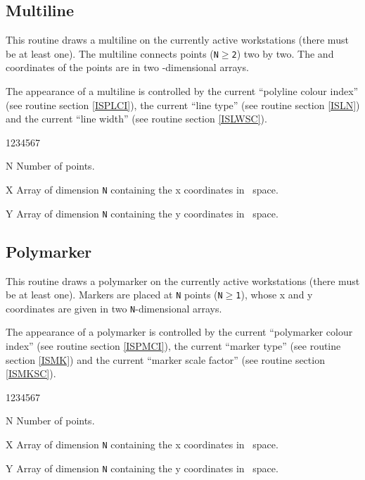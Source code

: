 \subsection{Multiline}
\Action
This routine draws a multiline on the currently active workstations (there must
be at least one). The multiline connects  points ({\tt N$\geq$2}) two
by two. The  and  coordinates of the points are in two 
-dimensional arrays.

The appearance of a multiline is controlled by the current ``polyline colour
index'' (see routine  section \ref{ISPLCI}), the current
``line type'' (see routine  section \ref{ISLN}) and the current
``line width'' (see routine  section \ref{ISLWSC}).
\Pdesc
\begin{DLtt}{1234567}
\item[N] Number of points.
\item[X] Array of dimension {\tt N} containing the x coordinates in \wc~space.
\item[Y] Array of dimension {\tt N} containing the y coordinates in \wc~space.
\end{DLtt}


\subsection{Polymarker}
\Action
This routine draws a polymarker on the currently active workstations (there must
be at least one). Markers are placed at {\tt N} points ({\tt N$\geq$1}), whose x
and y coordinates are given in two {\tt N}-dimensional arrays.

The appearance of a polymarker is controlled by the current ``polymarker colour
index'' (see routine  section \ref{ISPMCI}), the current ``marker
type'' (see routine  section \ref{ISMK}) and the current ``marker
scale factor'' (see routine  section \ref{ISMKSC}).
\Pdesc
\begin{DLtt}{1234567}
\item[N] Number of points.
\item[X] Array of dimension {\tt N} containing the x coordinates in \wc~space.
\item[Y] Array of dimension {\tt N} containing the y coordinates in \wc~space.
\end{DLtt}


